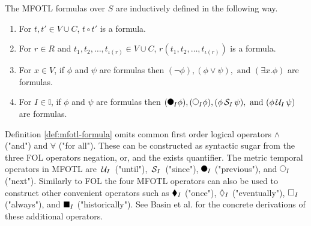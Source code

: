 \renewcommand{\labelenumi}{(\roman{enumi})}
\begin{definition}
    \label{def:mfotl-formula}
    The MFOTL formulas over $S$ are inductively defined in the following way.
    \begin{enumerate}
        \item For $t,t' \in V \cup C$, $t \circ t'$ is a formula.
        \item For $r \in R$ and $t_1, t_2, \dots, t_{\iota(r)} \in V \cup C$, $r(t_1,t_2,\dots,t_{\iota(r)})$ is a formula.
        \item For $x \in V$, if $\phi$ and $\psi$ are formulas then $(\neg \phi),(\phi \lor \psi),\text{ and }(\exists x . \phi)$ are formulas.
        \item For $I \in \mathbb{I}$, if $\phi$ and $\psi$ are formulas then $(\Previous{I} \phi), (\Next{I} \phi), (\phi \Since{I} \psi), \text{ and }(\phi \Until{I} \psi)$ are formulas.
    \end{enumerate}
\end{definition}

Definition \ref{def:mfotl-formula} omits common first order logical operators $\land$ ("and") and $\forall$ ("for all").
These can be constructed as syntactic sugar from the three FOL operators negation, or, and the exists quantifier.
The metric temporal operators in MFOTL are $\,\mathcal{U}_{I}\,$ ("until"), $\,\mathcal{S}_{I}\,$ ("since"), $\Previous{I}$ ("previous"), and $\Next{I}$ ("next").
Similarly to FOL the four MFOTL operators can also be used to construct other convenient operators such as $\blacklozenge_{I}$ ("once"), $\lozenge_{I}$ ("eventually"), $\square_{I}$ ("always"), and $\blacksquare_{I}$ ("historically").
See Basin et al. \cite{Basin2015} for the concrete derivations of these additional operators.

